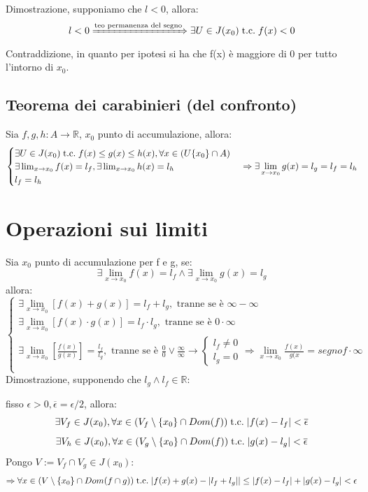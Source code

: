 \documentclass[a4paper, 12pt, openany]{book}
\begin{document}
 	Dimostrazione, supponiamo che $l < 0$, allora:
 	\[l < 0 \xRightarrow{\text{teo permanenza del segno}} \exists U \in J(x_0) \;\text{t.c.}\; f(x) < 0\]
 	Contraddizione, in quanto per ipotesi si ha che f(x) è maggiore di 0 per tutto l'intorno di $x_0$.
 	
 	\subsection{Teorema dei carabinieri (del confronto)}
 	Sia $f, g, h : A \rightarrow \mathbb{R}$, $x_0$ punto di accumulazione, allora:
 	\[\begin{cases}
 		\exists U \in J(x_0) \;\text{t.c.}\; f(x) \leq g(x) \leq h(x), \forall x \in (U \{x_0\} \cap A) \\
 		\exists \lim_{x \rightarrow x_0} f(x) = l_f, \exists \lim_{x \rightarrow x_0} h(x) = l_h \\
 		l_f = l_h
 	\end{cases}	\Rightarrow \exists \lim_{x \rightarrow x_0} g(x) = l_g = l_f = l_h\]
 	
 	\newpage
 	
 	\section{Operazioni sui limiti}
 	Sia $x_0$ punto di accumulazione per f e g, se:
 	\[\exists \lim_{x \rightarrow x_0} f(x) = l_f \wedge \exists \lim_{x \rightarrow x_0} g(x) =  l_g\]
 	allora:
 	\[
 	\begin{cases}
 		\exists \lim_{x \rightarrow x_0} [f(x) + g(x)] = l_f + l_g, \text{ tranne se è $\infty -\infty$} \\
 		\exists \lim_{x \rightarrow x_0} [f(x) \cdot g(x)] = l_f \cdot l_g, \text{ tranne se è $0 \cdot \infty$} \\
 		\exists \lim_{x \rightarrow x_0} [\frac{f(x)}{g(x)}] = \frac{l_f}{l_g}, \text{ tranne se è $\frac{0}{0} \vee \frac{\infty}{\infty}$} \rightarrow \begin{cases}
 		l_f \not = 0 \\
 		l_g = 0
 		\end{cases} \Rightarrow \lim_{x \rightarrow x_0} \frac{f(x)}{g(x} = segno f \cdot \infty\\ 		
 	\end{cases}
 	\]
 	Dimostrazione, supponendo che $l_g \wedge l_f \in \mathbb{R}$:
 	
 	fisso $\epsilon > 0, \overline{\epsilon} = \epsilon / 2$, allora:
 	\[\exists V_f \in J(x_0), \forall x \in (V_f \setminus \{x_0\} \cap Dom(f)) \;\text{t.c.}\; |f(x) - l_f| < \overline{\epsilon}\]
 	\[\exists V_h \in J(x_0), \forall x \in (V_g \setminus \{x_0\} \cap Dom(f)) \;\text{t.c.}\; |g(x) - l_g| < \overline{\epsilon}\]
 	Pongo $V := V_f \cap V_g \in J(x_0)$:
 	\[\Rightarrow \forall x \in (V \setminus \{x_0\} \cap Dom(f \cap g)) \;\text{t.c.}\; |f(x) + g(x) - |l_f + l_g|| \leq |f(x) - l_f|+|g(x) - l_g| < \epsilon\] 	
	 
\end{document}
